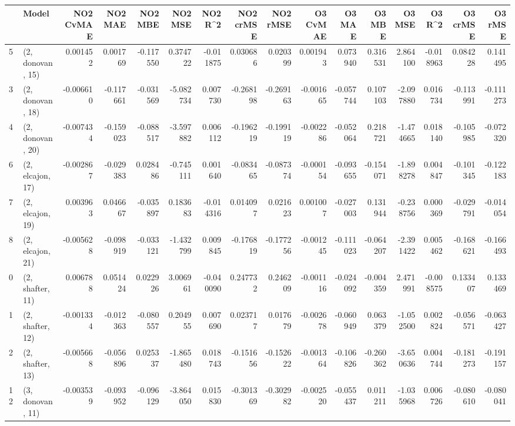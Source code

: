 \begin{tabular}{llrrrrrrrrrrrrrr}
\toprule
{} &             Model &  NO2 CvMAE &   NO2 MAE &   NO2 MBE &    NO2 MSE &   NO2 R\textasciicircum2 &  NO2 crMSE &  NO2 rMSE &  O3 CvMAE &    O3 MAE &    O3 MBE &     O3 MSE &    O3 R\textasciicircum2 &  O3 crMSE &   O3 rMSE \\
\midrule
5  &  (2, donovan, 15) &   0.001452 &  0.001769 & -0.117550 &   0.374722 & -0.011875 &   0.030686 &  0.020399 &  0.001943 &  0.073940 &  0.316531 &   2.864100 & -0.018963 &  0.084228 &  0.141495 \\
3  &  (2, donovan, 18) &  -0.006610 & -0.117661 & -0.031569 &  -5.082734 &  0.007730 &  -0.268198 & -0.269163 & -0.001665 & -0.057744 &  0.107103 &  -2.097880 &  0.016734 & -0.113991 & -0.111273 \\
4  &  (2, donovan, 20) &  -0.007434 & -0.159023 & -0.088517 &  -3.597882 &  0.006112 &  -0.196219 & -0.199119 & -0.002286 & -0.052064 &  0.218721 &  -1.474665 &  0.018140 & -0.105985 & -0.072320 \\
6  &  (2, elcajon, 17) &  -0.002867 & -0.029383 &  0.028486 &  -0.745111 &  0.001640 &  -0.083465 & -0.087374 & -0.000154 & -0.093655 & -0.154071 &  -1.898278 &  0.004847 & -0.101345 & -0.122183 \\
7  &  (2, elcajon, 19) &   0.003963 &  0.046667 & -0.035897 &   0.183683 & -0.014316 &   0.014097 &  0.021623 &  0.001007 & -0.027003 &  0.131944 &  -0.238756 &  0.000369 & -0.029791 & -0.014054 \\
8  &  (2, elcajon, 21) &  -0.005628 & -0.098919 & -0.033121 &  -1.432799 &  0.009845 &  -0.176819 & -0.177256 & -0.001245 & -0.111023 & -0.064207 &  -2.391422 &  0.005462 & -0.168621 & -0.166493 \\
0  &  (2, shafter, 11) &   0.006788 &  0.051424 &  0.022926 &   3.006961 & -0.040090 &   0.247732 &  0.246209 & -0.001116 & -0.024092 & -0.004359 &   2.471991 & -0.008575 &  0.133407 &  0.133469 \\
1  &  (2, shafter, 12) &  -0.001334 & -0.012363 & -0.080557 &   0.204955 &  0.007690 &   0.023717 &  0.017679 & -0.002678 & -0.060949 &  0.063379 &  -1.052500 &  0.002824 & -0.056571 & -0.063427 \\
2  &  (2, shafter, 13) &  -0.005668 & -0.056896 &  0.025337 &  -1.865480 &  0.018743 &  -0.151656 & -0.152622 & -0.001364 & -0.106826 & -0.260362 &  -3.650636 &  0.004744 & -0.181273 & -0.191157 \\
12 &  (3, donovan, 11) &  -0.003539 & -0.093952 & -0.096129 &  -3.864050 &  0.015830 &  -0.301369 & -0.302982 & -0.002520 & -0.055437 &  0.011211 &  -1.035968 &  0.006726 & -0.080610 & -0.080041 \\

\end{tabular}
